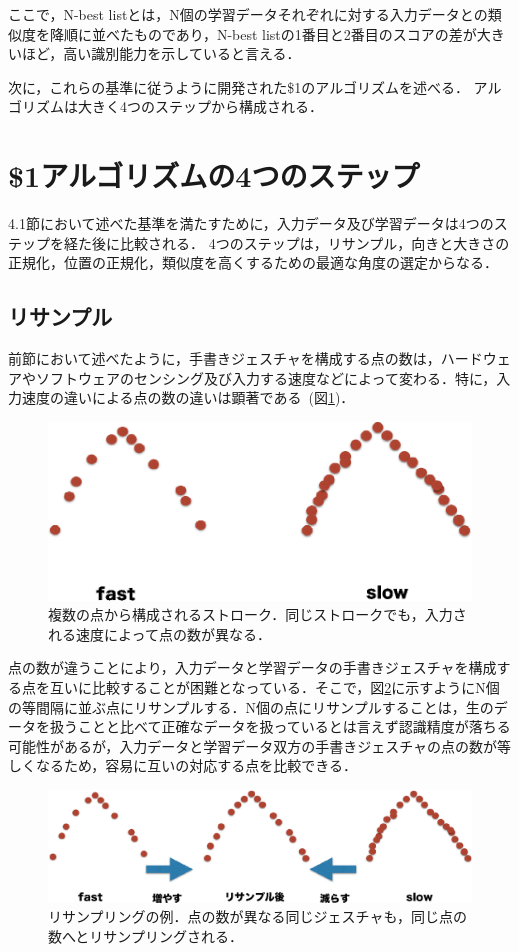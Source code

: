 ここで，N-best listとは，N個の学習データそれぞれに対する入力データとの類似度を降順に並べたものであり，N-best listの1番目と2番目のスコアの差が大きいほど，高い識別能力を示していると言える．

次に，これらの基準に従うように開発された\$1のアルゴリズムを述べる．
アルゴリズムは大きく4つのステップから構成される．


\section{\$1アルゴリズムの4つのステップ}
4.1節において述べた基準を満たすために，入力データ及び学習データは4つのステップを経た後に比較される．
4つのステップは，リサンプル，向きと大きさの正規化，位置の正規化，類似度を高くするための最適な角度の選定からなる．

\subsection{リサンプル}
前節において述べたように，手書きジェスチャを構成する点の数は，ハードウェアやソフトウェアのセンシング及び入力する速度などによって変わる．特に，入力速度の違いによる点の数の違いは顕著である~(図\ref{fig:strokes})．

\begin{figure} [!h]
\centering
\includegraphics [width=0.6\columnwidth]{img/strokes.eps}
\caption{複数の点から構成されるストローク．同じストロークでも，入力される速度によって点の数が異なる．}
\label{fig:strokes}
\end{figure}

点の数が違うことにより，入力データと学習データの手書きジェスチャを構成する点を互いに比較することが困難となっている．そこで，図\ref{fig:resample}に示すようにN個の等間隔に並ぶ点にリサンプルする．N個の点にリサンプルすることは，生のデータを扱うことと比べて正確なデータを扱っているとは言えず認識精度が落ちる可能性があるが，入力データと学習データ双方の手書きジェスチャの点の数が等しくなるため，容易に互いの対応する点を比較できる．

\begin{figure} [!h]
\centering
\includegraphics [width=0.8\columnwidth]{img/resample.eps}
\caption{リサンプリングの例．点の数が異なる同じジェスチャも，同じ点の数へとリサンプリングされる．}
\label{fig:resample}
\end{figure}

